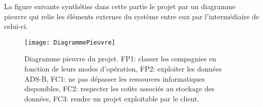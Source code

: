 La figure suivante synthétise dans cette partie le projet par un diagramme pieuvre qui relie les éléments externes du système entre eux par l'intermédiaire de celui-ci.

\begin{figure}[!ht]
	\centering
	\texttt{[image: DiagrammePieuvre]}
	\caption{
		Diagramme pieuvre du projet. FP1: classer les compagnies
		en fonction de leurs modes d'opération, FP2: exploiter les données ADS-B, 
		FC1: ne pas dépasser les ressources informatiques disponibles,
		FC2: respecter les coûts associés au stockage des données,
		FC3: rendre un projet exploitable par le client.
	}
	\label{fig:pieuvre}
\end{figure}


